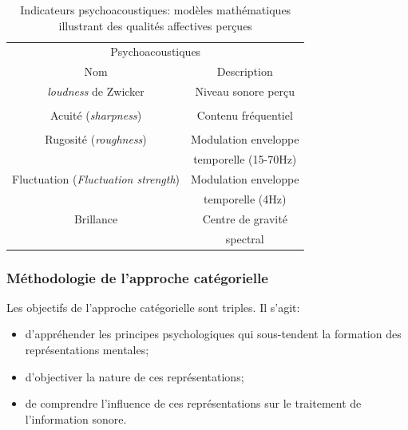 \begin{table}[t]
\centering
\begin{tabular}{c c} 
\multicolumn{2}{c}{Psychoacoustiques} \\ 
Nom                           & Description            \\                      
\hline
\emph{loudness} de Zwicker                & Niveau sonore perçu     \\
                                          &         \\
Acuité (\emph{sharpness})                 & Contenu fréquentiel       \\
                                          &         \\
Rugosité (\emph{roughness})               & Modulation enveloppe        \\
                                          & temporelle (15-70Hz)       \\
Fluctuation (\emph{Fluctuation strength}) & Modulation enveloppe      \\
                                          & temporelle (4Hz)          \\
Brillance                                 & Centre de gravité       \\
                                          & spectral         \\                                       
\hline
\end{tabular}
\vspace{0.5mm}
\caption{Indicateurs psychoacoustiques: modèles mathématiques illustrant des qualités affectives perçues}
\label{tab:psychoAcousIndi}
\end{table}


\subsubsection{Méthodologie de l'approche catégorielle}
\label{sec:ch3_appCategorielle}

Les objectifs de l'approche catégorielle sont triples. Il s'agit:

\begin{itemize}
\item d'appréhender les principes psychologiques qui sous-tendent la formation des représentations mentales;
\item d'objectiver la nature de ces représentations;
\item de comprendre l'influence de ces représentations sur le traitement de l'information sonore.
\end{itemize}
 
